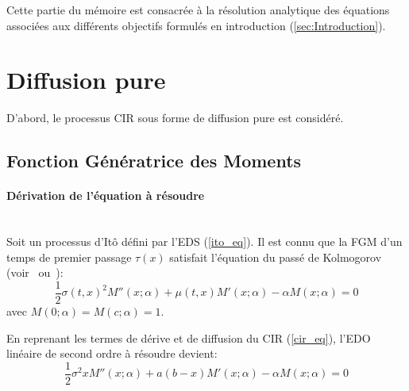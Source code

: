 \label{sec:Theme1}

Cette partie du mémoire est consacrée à la résolution analytique des équations associées aux différents objectifs formulés en introduction (\ref{sec:Introduction}).

\section{Diffusion pure}
D'abord, le processus \acs{CIR} sous forme de diffusion pure est considéré. 
\subsection{Fonction Génératrice des Moments}\label{subsection_fgm_eq}
\paragraph{Dérivation de l'équation à résoudre}\phantom{}\\
Soit un processus d'Itô défini par l'\ac{EDS} (\ref{ito_eq}).
Il est connu que la \acl{FGM} d'un temps de premier passage $\tau(x)$ satisfait l'équation du passé de Kolmogorov (voir~\cite{cox2017} ou~\cite{lefebvre2007}): 
\[
\frac{1}{2}\sigma{(t,x)}^2M''(x;\alpha)+\mu(t,x)M'(x;\alpha)-\alpha M(x;\alpha)=0
\]
avec $M(0;\alpha)=M(c;\alpha)=1$. 

En reprenant les termes de dérive et de diffusion du \acs{CIR} (\ref{cir_eq}), l'\ac{EDO} linéaire de second ordre à résoudre devient: 
\begin{equation}\label{ode_fgm}
    \frac{1}{2}\sigma^2xM''(x;\alpha)+a(b-x)M'(x;\alpha)-\alpha M(x;\alpha)=0
\end{equation}

